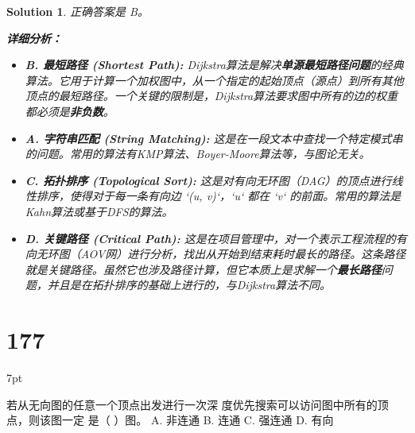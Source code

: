 \documentclass[UTF8]{report}
\newtheorem{solution}{Solution}
\theoremstyle{MyLineTheoremStyle} %
\theoremstyle{MyBlockTheoremStyle} %
\theoremstyle{MySubsubsectionStyle} %
\newenvironment{graybox}{%
        \def\FrameCommand{%
        \hspace{1pt}%
        {\color{gray}\small \vrule width 2pt}%
        {\color{graybox_color}\vrule width 4pt}%
        \colorbox{graybox_color}%
        }%
        \MakeFramed{\advance\hsize-\width\FrameRestore}%
        \noindent\hspace{-4.55pt}%
        \begin{adjustwidth}{}{7pt}%
        \vspace{2pt}\vspace{2pt}%
        }
        {%
        \vspace{2pt}\end{adjustwidth}\endMakeFramed%
        }
\begin{document}
\begin{solution}
正确答案是 B。

\textbf{详细分析：}

\begin{itemize}
    \item \textbf{B. 最短路径 (Shortest Path):}
    Dijkstra算法是解决\textbf{单源最短路径问题}的经典算法。它用于计算一个加权图中，从一个指定的起始顶点（源点）到所有其他顶点的最短路径。一个关键的限制是，Dijkstra算法要求图中所有的边的权重都必须是\textbf{非负数}。

    \item \textbf{A. 字符串匹配 (String Matching):}
    这是在一段文本中查找一个特定模式串的问题。常用的算法有KMP算法、Boyer-Moore算法等，与图论无关。

    \item \textbf{C. 拓扑排序 (Topological Sort):}
    这是对有向无环图（DAG）的顶点进行线性排序，使得对于每一条有向边 `(u, v)`，`u` 都在 `v` 的前面。常用的算法是Kahn算法或基于DFS的算法。

    \item \textbf{D. 关键路径 (Critical Path):}
    这是在项目管理中，对一个表示工程流程的有向无环图（AOV网）进行分析，找出从开始到结束耗时最长的路径。这条路径就是关键路径。虽然它也涉及路径计算，但它本质上是求解一个\textbf{最长路径}问题，并且是在拓扑排序的基础上进行的，与Dijkstra算法不同。
\end{itemize}
\end{solution}


\section*{177}
\begin{graybox}
若从无向图的任意一个顶点出发进行一次深
度优先搜索可以访问图中所有的顶点，则该图一定
是（ ）图。
A. 非连通
B. 连通
C. 强连通
D. 有向
\end{graybox}
\end{document}
